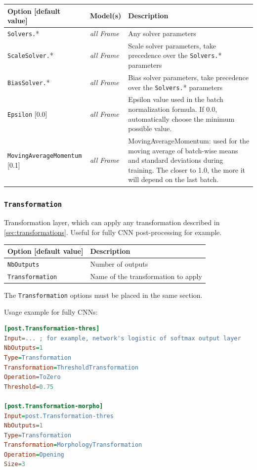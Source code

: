 \documentclass[a4paper,11pt,oneside]{article}
\begin{document}
\begin{center}
 \begin{longtable}{| p{4cm} | p{3cm} | p{9cm} | }
 \hline
 Option [default value] & Model(s) & Description\\
 \hline\hline
  \lstinline!Solvers.!* & \emph{all Frame} & Any solver parameters \\
  \lstinline!ScaleSolver.!* & \emph{all Frame} & Scale solver parameters,
  take precedence over the \lstinline!Solvers.!* parameters \\
  \lstinline!BiasSolver.!* & \emph{all Frame} & Bias solver parameters,
  take precedence over the \lstinline!Solvers.!* parameters \\
  \lstinline!Epsilon! [0.0] & \emph{all Frame} & Epsilon value used in the batch normalization formula. If 0.0, automatically choose the minimum possible
  value. \\
  \lstinline!MovingAverageMomentum! [0.1] & \emph{all Frame} & MovingAverageMomentum: used for the moving average of
  batch-wise means and standard deviations during training. The closer to 1.0, the more it will depend on the last batch. \\
 \hline
\end{longtable}
\end{center}


\subsubsection{\texorpdfstring{%
\lstinline[basicstyle=\ttfamily\bfseries]!Transformation!}{Transformation}}
Transformation layer, which can apply any transformation described in \ref{sec:transformations}. Useful for fully CNN post-processing for example.

\begin{center}
 \begin{longtable}{| p{5cm} | p{10cm} | }
 \hline
 Option [default value] & Description\\
 \hline\hline
  \cellcolor{requiredcolor}\lstinline!NbOutputs! & Number of outputs \\
  \cellcolor{requiredcolor}\lstinline!Transformation! & Name of the
  transformation to apply \\
 \hline
\end{longtable}
\end{center}

The \lstinline!Transformation! options must be placed in the same section.


Usage example for fully CNNs:
\begin{lstlisting}[language=ini]
[post.Transformation-thres]
Input=... ; for example, network's logistic of softmax output layer
NbOutputs=1
Type=Transformation
Transformation=ThresholdTransformation
Operation=ToZero
Threshold=0.75

[post.Transformation-morpho]
Input=post.Transformation-thres
NbOutputs=1
Type=Transformation
Transformation=MorphologyTransformation
Operation=Opening
Size=3
\end{lstlisting}
\end{document}
